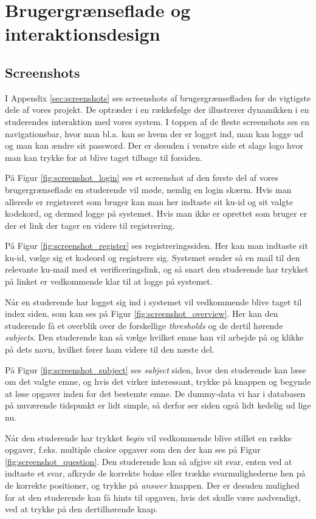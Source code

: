 \documentclass[11pt, a4paper]{article}
\begin{document}
\section{Brugergrænseflade og interaktionsdesign}
\label{sec:brugergraenseflade}
\subsection{Screenshots}
I Appendix \ref{sec:screenshots} ses screenshots af brugergrænsefladen for de vigtigste dele af vores projekt. De optræder i en rækkefølge der illustrerer dynamikken i en studerendes interaktion med vores system. I toppen af de fleste screenshots ses en navigationsbar, hvor man bl.a. kan se hvem der er logget ind, man kan logge ud og man kan ændre sit password. Der er desuden i venstre side et slags logo hvor man kan trykke for at blive taget tilbage til forsiden.

På Figur \ref{fig:screenshot_login} ses et screenshot af den første del af vores brugergrænseflade en studerende vil møde, nemlig en login skærm. Hvis man allerede er registreret som bruger kan man her indtaste sit ku-id og sit valgte kodekord, og dermed logge på systemet. Hvis man ikke er oprettet som bruger er der et link der tager en videre til registrering.

På Figur \ref{fig:screenshot_register} ses registreringssiden. Her kan man indtaste sit ku-id, vælge sig et kodeord og registrere sig. Systemet sender så en mail til den relevante ku-mail med et verificeringslink, og så snart den studerende har trykket på linket er vedkommende klar til at logge på systemet.

Når en studerende har logget sig ind i systemet vil vedkommende blive taget til index siden, som kan ses på Figur \ref{fig:screenshot_overview}. Her kan den studerende få et overblik over de forskellige \emph{thresholds} og de dertil hørende \emph{subjects}. Den studerende kan så vælge hvilket emne han vil arbejde på og klikke på dets navn, hvilket fører ham videre til den næste del.

På Figur \ref{fig:screenshot_subject} ses \emph{subject} siden, hvor den studerende kan læse om det valgte emne, og hvis det virker interessant, trykke på knappen og begynde at løse opgaver inden for det bestemte emne. De dummy-data vi har i databasen på nuværende tidspunkt er lidt simple, så derfor ser siden også lidt kedelig ud lige nu.

Når den studerende har trykket \emph{begin} vil vedkommende blive stillet en række opgaver, f.eks. multiple choice opgaver som den der kan ses på Figur \ref{fig:screenshot_question}. Den studerende kan så afgive sit svar, enten ved at indtaste et svar, afkryde de korrekte bokse eller trække svarmulighederne hen på de korrekte positioner, og trykke på \emph{answer} knappen. Der er desuden mulighed for at den studerende kan få hints til opgaven, hvis det skulle være nødvendigt, ved at trykke på den dertilhørende knap.
\end{document}
